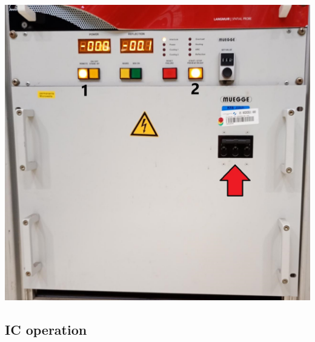 \documentclass[fleqn,a4paper,20pt]{article}
\begin{document}
\begin{minipage}{.35\textwidth}
\centering
\includegraphics[width=\linewidth]{EC1}
\captionsetup{width=0.75\textwidth}
\label{EC1}
\end{minipage}





\newpage
\subsection{IC operation}
\end{document}
